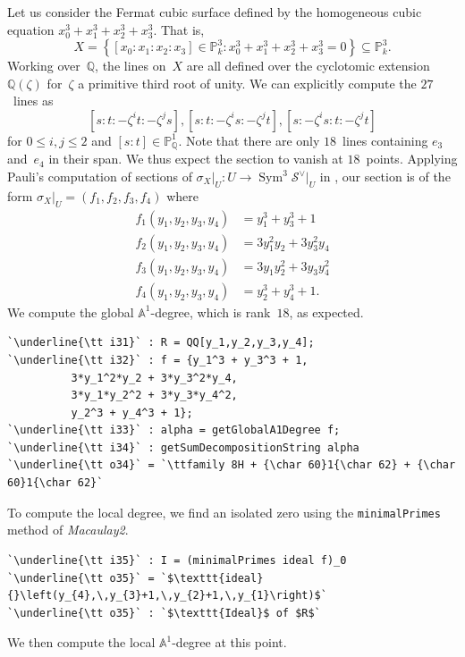 \documentclass[12pt]{amsart}
\theoremstyle{definition}
\DeclareMathOperator{\Sym}{Sym}
\begin{document}
Let us consider the Fermat cubic surface defined by the homogeneous cubic equation $x_{0}^{3}+x_{1}^{3}+x_{2}^{3}+x_{3}^{3}$. That is, 
\[
X=\left\{[x_{0}:x_{1}:x_{2}:x_{3}]\in\mathbb{P}_k^{3}:x_{0}^{3}+x_{1}^{3}+x_{2}^{3}+x_{3}^{3}=0\right\}\subseteq\mathbb{P}_k^{3}.
\]
Working over~$\mathbb{Q}$, the lines on~$X$ are all defined over the cyclotomic extension $\mathbb{Q}(\zeta)$ for~$\zeta$ a primitive third root of unity. We can explicitly compute the $27$~lines as
\[
[s:t:-\zeta^{i}t:-\zeta^{j}s], [s:t:-\zeta^{i}s:-\zeta^{j}t], [s:-\zeta^{i}s: t:-\zeta^{j}t]
\]
for $0\leq i,j\leq 2$ and $[s:t]\in\mathbb{P}_{\mathbb{Q}}^{1}$. Note that there are only $18$~lines containing $e_{3}$ and~$e_{4}$ in their span. We thus expect the section to vanish at $18$~points. Applying Pauli's computation of sections of $\sigma_{X}\rvert_{U}\colon U\to\Sym^{3}\mathcal{S}^{\vee}\rvert_{U}$ in \cite[\S 2.2, Remark 2.7]{Pauli}, our section is of the form $\sigma_{X}\rvert_{U}=(f_{1},f_{2},f_{3},f_{4})$ where
\begin{align*}
    f_{1}(y_{1},y_{2},y_{3},y_{4}) &= y_{1}^{3}+y_{3}^{3}+1 \\
    f_{2}(y_{1},y_{2},y_{3},y_{4}) &= 3y_{1}^{2}y_{2}+3y_{3}^{2}y_{4}\\
    f_{3}(y_{1},y_{2},y_{3},y_{4}) &= 3y_{1}y_{2}^{2}+3y_{3}y_{4}^{2}\\
    f_{4}(y_{1},y_{2},y_{3},y_{4}) &= y_{2}^{3}+y_{4}^{3}+1.
\end{align*}
We compute the global $\mathbb{A}^{1}$-degree, which is rank~$18$, as expected. 

\begin{lstlisting}[language=Macaulay2output]
`\underline{\tt i31}` : R = QQ[y_1,y_2,y_3,y_4];
`\underline{\tt i32}` : f = {y_1^3 + y_3^3 + 1, 
          3*y_1^2*y_2 + 3*y_3^2*y_4, 
          3*y_1*y_2^2 + 3*y_3*y_4^2, 
          y_2^3 + y_4^3 + 1};
`\underline{\tt i33}` : alpha = getGlobalA1Degree f;
`\underline{\tt i34}` : getSumDecompositionString alpha
`\underline{\tt o34}` = `\ttfamily 8H + {\char 60}1{\char 62} + {\char 60}1{\char 62}`
\end{lstlisting}
To compute the local degree, we find an isolated zero using the \texttt{minimalPrimes} method of \emph{Macaulay2}.

\begin{lstlisting}[language=Macaulay2output]
`\underline{\tt i35}` : I = (minimalPrimes ideal f)_0
`\underline{\tt o35}` = `$\texttt{ideal}{}\left(y_{4},\,y_{3}+1,\,y_{2}+1,\,y_{1}\right)$`
`\underline{\tt o35}` : `$\texttt{Ideal}$ of $R$`
\end{lstlisting}
We then compute the local $\mathbb{A}^{1}$-degree at this point.
\end{document}
